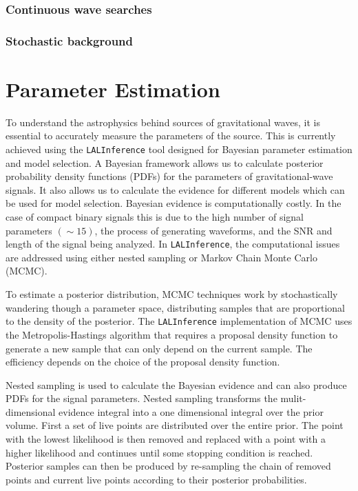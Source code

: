 \documentclass[letterpaper, aps, prd, superscriptaddress, showpacs, nofootinbib]{revtex4}
\begin{document}
\subsubsection{Continuous wave searches}

\subsubsection{Stochastic background}

\section{Parameter Estimation}
\label{sec:pe}

To understand the astrophysics behind sources of gravitational waves, it is essential to accurately 
measure the parameters of the source. This is currently achieved using the \texttt{LALInference} \cite{veitch:15}
tool designed for Bayesian parameter estimation and model selection. A Bayesian framework allows us to calculate posterior probability density functions (PDFs) for the parameters of gravitational-wave signals. It also allows us to calculate the evidence for different models which can be used for model selection. Bayesian evidence is computationally costly. In the case of compact binary signals this is due to the high number of signal parameters $(\sim 15)$, the process of generating waveforms, and the SNR and length of the signal being analyzed. In \texttt{LALInference}, the computational issues are addressed using either nested sampling \cite{2010PhRvD..81f2003V} or Markov Chain Monte Carlo (MCMC). 

To estimate a posterior distribution, MCMC techniques work by stochastically wandering though a parameter space, distributing samples that are proportional to the density of the posterior.  The \texttt{LALInference} implementation of MCMC uses the Metropolis-Hastings algorithm that requires a proposal density function to generate a new sample that can only depend on the current sample. The efficiency depends on the choice of the proposal density function. 

Nested sampling is used to calculate the Bayesian evidence and can also produce PDFs for the signal parameters. Nested sampling transforms the mulit-dimensional evidence integral into a one dimensional integral over the prior volume. First a set of live points are distributed over the entire prior. The point with the lowest likelihood is then removed and replaced with a point with a higher likelihood and continues until some stopping condition is reached. Posterior samples can then be produced by re-sampling the chain of removed points and current live points according to their posterior probabilities.
\end{document}
